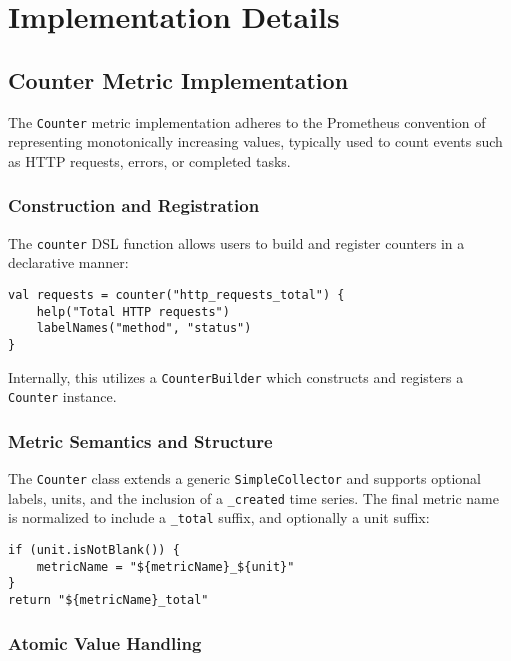\chapter{Implementation Details} \label{cap:implementation}



\section{Counter Metric Implementation}

The \texttt{Counter} metric implementation adheres to the Prometheus convention of representing monotonically increasing values, typically used to count events such as HTTP requests, errors, or completed tasks.

\subsection{Construction and Registration}
The \texttt{counter} DSL function allows users to build and register counters in a declarative manner:
\begin{verbatim}
val requests = counter("http_requests_total") {
    help("Total HTTP requests")
    labelNames("method", "status")
}
\end{verbatim}
Internally, this utilizes a \texttt{CounterBuilder} which constructs and registers a \texttt{Counter} instance.




\subsection{Metric Semantics and Structure}
The \texttt{Counter} class extends a generic \texttt{SimpleCollector} and supports optional labels, units, and the inclusion of a \texttt{\_created} time series. The final metric name is normalized to include a \texttt{\_total} suffix, and optionally a unit suffix:
\begin{verbatim}
if (unit.isNotBlank()) {
    metricName = "${metricName}_${unit}"
}
return "${metricName}_total"
\end{verbatim}




\subsection{Atomic Value Handling}

